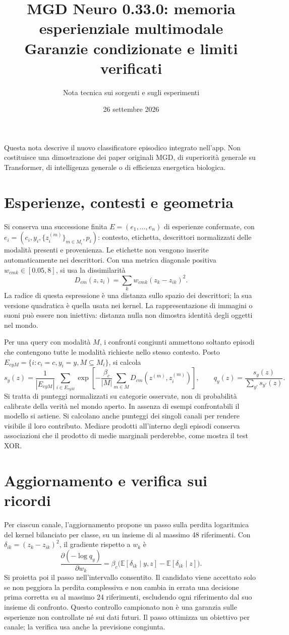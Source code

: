 \documentclass[11pt,a4paper]{article}
\title{MGD Neuro 0.33.0: memoria esperienziale multimodale\\Garanzie condizionate e limiti verificati}
\author{Nota tecnica sui sorgenti e sugli esperimenti}
\date{26 settembre 2026}
\begin{document}
\maketitle
\noindent Questa nota descrive il nuovo classificatore episodico integrato nell'app.
Non costituisce una dimostrazione dei paper originali MGD, di superiorità generale
su Transformer, di intelligenza generale o di efficienza energetica biologica.

\section{Esperienze, contesti e geometria}
Si conserva una successione finita $E=(e_1,\ldots,e_n)$ di esperienze confermate,
con $e_i=(c_i,y_i,\{z_i^{(m)}\}_{m\in M_i},p_i)$: contesto, etichetta,
descrittori normalizzati delle modalità presenti e provenienza.
Le etichette non vengono inserite automaticamente nei descrittori.
Con una metrica diagonale positiva $w_{cmk}\in[0.05,8]$, si usa la dissimilarità
\[
 D_{cm}(z,z_i)=\sum_k w_{cmk}(z_k-z_{ik})^2.
\]
La radice di questa espressione è una distanza sullo spazio dei descrittori;
la sua versione quadratica è quella usata nei kernel. La rappresentazione di
immagini o suoni può essere non iniettiva: distanza nulla non dimostra identità
degli oggetti nel mondo.

Per una query con modalità $M$, i confronti congiunti ammettono soltanto episodi
che contengono tutte le modalità richieste nello stesso contesto. Posto
$E_{cyM}=\{i:c_i=c,y_i=y,M\subseteq M_i\}$, si calcola
\[
 s_y(z)=\frac1{|E_{cyM}|}\sum_{i\in E_{cyM}}
 \exp\!\left[-\frac{\beta_c}{|M|}\sum_{m\in M}D_{cm}(z^{(m)},z_i^{(m)})\right],
 \qquad q_y(z)=\frac{s_y(z)}{\sum_{y'}s_{y'}(z)}.
\]
Si tratta di punteggi normalizzati su categorie osservate, non di probabilità
calibrate della verità nel mondo aperto. In assenza di esempi confrontabili il
modello si astiene. Si calcolano anche punteggi dei singoli canali per rendere
visibile il loro contributo. Mediare prodotti all'interno degli episodi conserva
associazioni che il prodotto di medie marginali perderebbe, come mostra il test XOR.

\section{Aggiornamento e verifica sui ricordi}
Per ciascun canale, l'aggiornamento propone un passo sulla perdita logaritmica
del kernel bilanciato per classe, su un insieme di al massimo 48 riferimenti.
Con $\delta_{ik}=(z_k-z_{ik})^2$, il gradiente rispetto a $w_k$ è
\[
 \frac{\partial(-\log q_y)}{\partial w_k}
 =\beta_c\bigl(\mathbb E[\delta_{ik}\mid y,z]
                  -\mathbb E[\delta_{ik}\mid z]\bigr).
\]
Si proietta poi il passo nell'intervallo consentito. Il candidato viene accettato
solo se non peggiora la perdita complessiva e non cambia in errata una decisione
prima corretta su al massimo 24 riferimenti, escludendo ogni riferimento dal suo
insieme di confronto. Questo controllo campionato non è una garanzia sulle
esperienze non controllate né sui dati futuri. Il passo ottimizza un obiettivo
per canale; la verifica usa anche la previsione congiunta.
\end{document}
